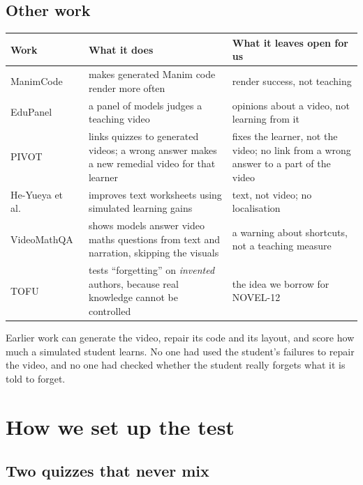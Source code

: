 \documentclass[11pt]{article}
\begin{document}
\subsection{Other work}

\begin{center}\small
\begin{tabular}{p{2.6cm}p{5.4cm}p{6.4cm}}
\toprule
Work & What it does & What it leaves open for us \\
\midrule
ManimCode~\cite{manimcode} & makes generated Manim code render more often & render success, not teaching \\
EduPanel~\cite{edupanel} & a panel of models judges a teaching video & opinions about a video, not learning from it \\
PIVOT~\cite{pivot} & links quizzes to generated videos; a wrong answer makes a new remedial video for that learner &
fixes the learner, not the video; no link from a wrong answer to a part of the video \\
He-Yueya et al.~\cite{heyueya2024} & improves text worksheets using simulated learning gains & text, not video; no
localisation \\
VideoMathQA~\cite{videomathqa} & shows models answer video maths questions from text and narration, skipping the
visuals & a warning about shortcuts, not a teaching measure \\
TOFU~\cite{tofu} & tests ``forgetting'' on \emph{invented} authors, because real knowledge cannot be controlled & the
idea we borrow for NOVEL-12 \\
\bottomrule
\end{tabular}
\end{center}

\begin{inshort}
Earlier work can generate the video, repair its code and its layout, and score how much a simulated student learns.
No one had used the student's failures to repair the video, and no one had checked whether the student really forgets
what it is told to forget.
\end{inshort}

\section{How we set up the test}\label{sec:setup}

\subsection{Two quizzes that never mix}
\end{document}
